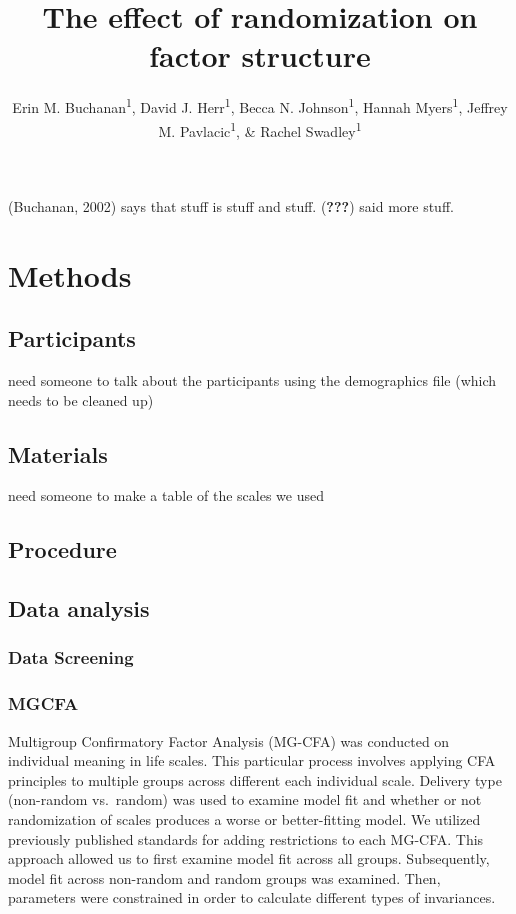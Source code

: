 \documentclass[english,man]{apa6}
\title{The effect of randomization on factor structure}
\author{Erin M. Buchanan\textsuperscript{1}, David J. Herr\textsuperscript{1}, Becca N. Johnson\textsuperscript{1}, Hannah Myers\textsuperscript{1}, Jeffrey M. Pavlacic\textsuperscript{1}, \& Rachel Swadley\textsuperscript{1}}
\affiliation{
    \vspace{0.5cm}
          \textsuperscript{1} Missouri State University  }
\begin{document}
\maketitle

\setcounter{secnumdepth}{0}



(Buchanan, 2002) says that stuff is stuff and stuff. ({\textbf{???}})
said more stuff.

\section{Methods}\label{methods}

\subsection{Participants}\label{participants}

need someone to talk about the participants using the demographics file
(which needs to be cleaned up)

\subsection{Materials}\label{materials}

need someone to make a table of the scales we used

\subsection{Procedure}\label{procedure}

\subsection{Data analysis}\label{data-analysis}

\subsubsection{Data Screening}\label{data-screening}

\subsubsection{MGCFA}\label{mgcfa}

Multigroup Confirmatory Factor Analysis (MG-CFA) was conducted on
individual meaning in life scales. This particular process involves
applying CFA principles to multiple groups across different each
individual scale. Delivery type (non-random vs.~random) was used to
examine model fit and whether or not randomization of scales produces a
worse or better-fitting model. We utilized previously published
standards for adding restrictions to each MG-CFA. This approach allowed
us to first examine model fit across all groups. Subsequently, model fit
across non-random and random groups was examined. Then, parameters were
constrained in order to calculate different types of invariances.
\end{document}
